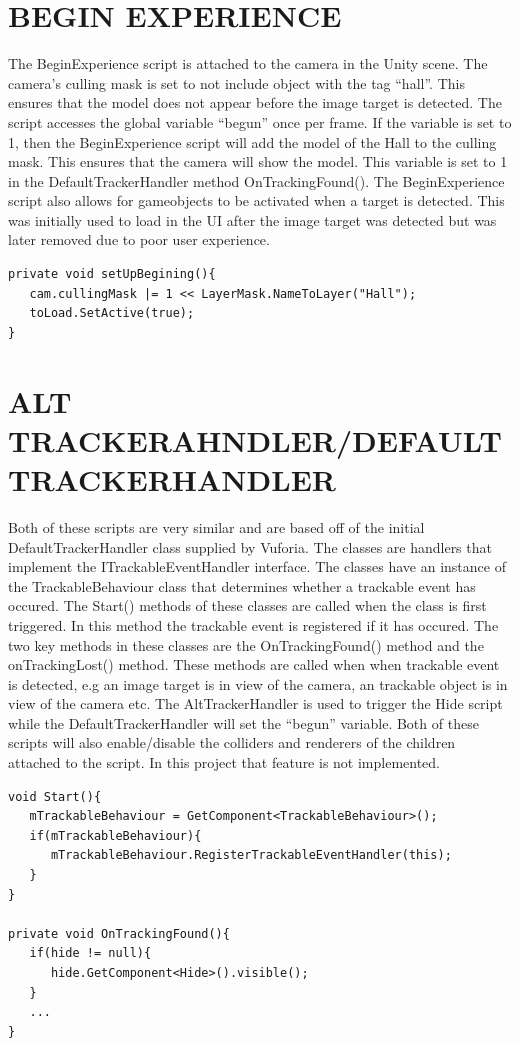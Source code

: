 \section{BEGIN EXPERIENCE}
The BeginExperience script is attached to the camera in the Unity scene. The camera's culling mask is set to not include object with the tag “hall”. This ensures that the model does not appear before the image target is detected. The script accesses the global variable “begun” once per frame. If the variable is set to 1, then the BeginExperience script will add the model of the Hall to the culling mask. This ensures that the camera will show the model. This variable is set to 1 in the DefaultTrackerHandler method OnTrackingFound(). The BeginExperience script also allows for gameobjects to be activated when a target is detected. This was initially used to load in the UI after the image target was detected but was later removed due to poor user experience. 

\begin{lstlisting}
private void setUpBegining(){
   cam.cullingMask |= 1 << LayerMask.NameToLayer("Hall");
   toLoad.SetActive(true);
}
\end{lstlisting}

\section{ALT TRACKERAHNDLER/DEFAULTTRACKERHANDLER}
Both of these scripts are very similar and are based off of the initial DefaultTrackerHandler class supplied by Vuforia. The classes are handlers that implement the ITrackableEventHandler interface. The classes have an instance of the TrackableBehaviour class that determines whether a trackable event has occured. The Start() methods of these classes are called when the class is first triggered. In this method the trackable event is registered if it has occured. The two key methods in these classes are the OnTrackingFound() method and the onTrackingLost() method. These methods are called when when trackable event is detected, e.g an image target is in view of the camera, an trackable object is in view of the camera etc. The AltTrackerHandler is used to trigger the Hide script while the DefaultTrackerHandler will set the “begun” variable. Both of these scripts will also enable/disable the colliders and renderers of the children attached to the script. In this project that feature is not implemented.

\begin{lstlisting}
void Start(){
   mTrackableBehaviour = GetComponent<TrackableBehaviour>();
   if(mTrackableBehaviour){
      mTrackableBehaviour.RegisterTrackableEventHandler(this);
   }
}

private void OnTrackingFound(){
   if(hide != null){
      hide.GetComponent<Hide>().visible();
   }
   ...
}
\end{lstlisting}


